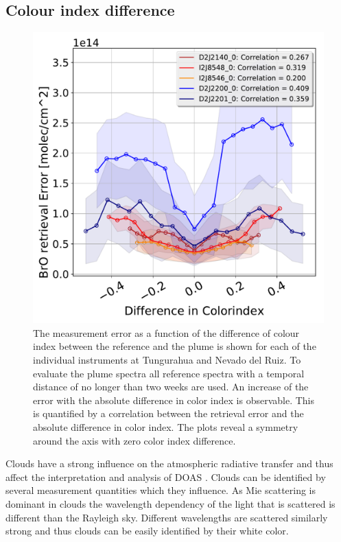 \subsection{ Colour index difference}
\begin{figure}
    \centering
    \includegraphics[width=0.7\linewidth]{Bilder/DiffColidxallInstruments}
    \caption[The  measurement error as a function of the difference of colour index between the reference and the plume is shown for each of the individual instruments at Tungurahua and Nevado del Ruiz.]{The  measurement error as a function of the difference of colour index between the reference and the plume is shown for each of the individual instruments at Tungurahua and Nevado del Ruiz. To evaluate the plume spectra all reference spectra with a temporal distance of no longer than two weeks are used. An increase of the  error with the absolute difference in color index is observable. This is quantified by a correlation between the  retrieval error and the absolute difference in color index. The plots reveal a symmetry around the axis with zero color index difference. }
    \label{fig:diffcolidx}
\end{figure}
Clouds have a strong influence on the atmospheric radiative transfer and thus affect the interpretation and analysis of DOAS \citep{wagner2014cloud}.
Clouds can be identified by several measurement quantities which they influence.
As Mie scattering is dominant in clouds the wavelength dependency of the light that is scattered is different than the Rayleigh sky. Different wavelengths are scattered similarly strong and thus clouds can be easily identified by their white color.
